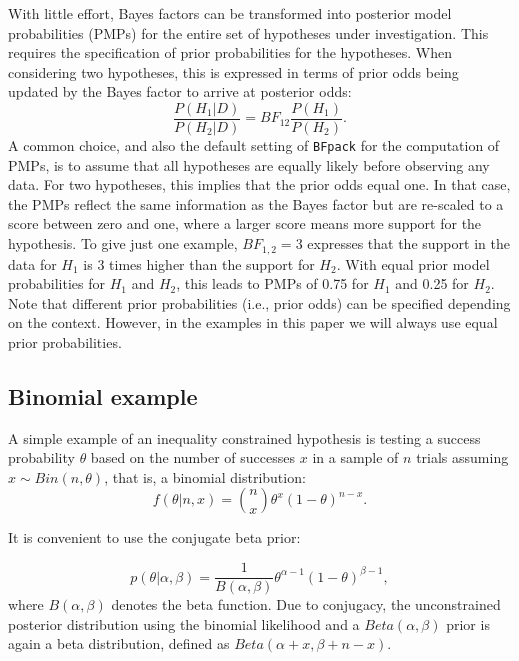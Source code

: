 \documentclass[11pt,reqno]{article}
\begin{document}
With little effort, Bayes factors can be transformed into posterior model probabilities (PMPs) for the entire set of hypotheses under investigation. This requires the specification of prior probabilities for the hypotheses. When considering two hypotheses, this is expressed in terms of prior odds being updated by the Bayes factor to arrive at posterior odds:
\begin{equation}\label{odds}
  \frac{P(H_1|D)}{P(H_2|D)}  = BF_{12} \frac{P(H_1)}{P(H_2)}.
\end{equation}
A common choice, and also the default setting of \texttt{BFpack} for the computation of PMPs, is to assume that all hypotheses are equally likely before observing any data. For two hypotheses, this implies that the prior odds equal one. In that case, the PMPs reflect the same information as the Bayes factor but are re-scaled to a score between zero and one, where a larger score means more support for the hypothesis. To give just one example, $BF_{1,2}=3$ expresses that the support in the data for $H_1$ is 3 times higher than the support for $H_2$. With equal prior model probabilities for $H_1$ and $H_2$, this leads to PMPs of 0.75 for $H_1$ and 0.25 for $H_2$. Note that different prior probabilities (i.e., prior odds) can be specified depending on the context. However, in the examples in this paper we will always use equal prior probabilities.




\subsection{Binomial example}\label{Singlestudy}


A simple example of an inequality constrained hypothesis is testing a success probability $\theta$ based on the number of successes $x$ in a sample of $n$ trials assuming $x \sim Bin(n, \theta)$, that is, a binomial distribution:
\begin{equation}\label{binlik}
  f(\theta|n, x) = \binom{n}{x}\theta^x(1-\theta)^{n-x}.
\end{equation}

\noindent It is convenient to use the conjugate beta prior:

\begin{equation}\label{betaprior}
  p(\theta|\alpha, \beta) = \frac{1}{B(\alpha, \beta)} \theta^{\alpha-1}(1-\theta)^{\beta-1},
\end{equation}
where $B(\alpha, \beta)$ denotes the beta function. 
Due to conjugacy, the unconstrained posterior distribution using the binomial likelihood and a $Beta(\alpha,\beta)$ prior is again a beta distribution, defined as $Beta(\alpha+x, \beta+n-x)$.
\end{document}
